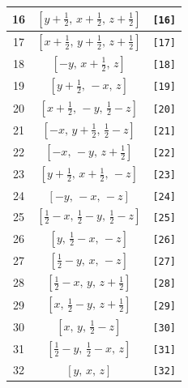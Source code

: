 \documentclass[fleqn,8pt]{jsarticle}
\begin{document}
\begin{longtable}{ccc}
16 & $\left[ y + \frac{1}{2},\, x + \frac{1}{2},\, z + \frac{1}{2} \right]$ & {\tt [16]} \\ \hline
17 & $\left[ x + \frac{1}{2},\, y + \frac{1}{2},\, z + \frac{1}{2} \right]$ & {\tt [17]} \\ \hline
18 & $\left[ - y,\, x + \frac{1}{2},\, z \right]$ & {\tt [18]} \\ \hline
19 & $\left[ y + \frac{1}{2},\, - x,\, z \right]$ & {\tt [19]} \\ \hline
20 & $\left[ x + \frac{1}{2},\, - y,\, \frac{1}{2} - z \right]$ & {\tt [20]} \\ \hline
21 & $\left[ - x,\, y + \frac{1}{2},\, \frac{1}{2} - z \right]$ & {\tt [21]} \\ \hline
22 & $\left[ - x,\, - y,\, z + \frac{1}{2} \right]$ & {\tt [22]} \\ \hline
23 & $\left[ y + \frac{1}{2},\, x + \frac{1}{2},\, - z \right]$ & {\tt [23]} \\ \hline
24 & $\left[ - y,\, - x,\, - z \right]$ & {\tt [24]} \\ \hline
25 & $\left[ \frac{1}{2} - x,\, \frac{1}{2} - y,\, \frac{1}{2} - z \right]$ & {\tt [25]} \\ \hline
26 & $\left[ y,\, \frac{1}{2} - x,\, - z \right]$ & {\tt [26]} \\ \hline
27 & $\left[ \frac{1}{2} - y,\, x,\, - z \right]$ & {\tt [27]} \\ \hline
28 & $\left[ \frac{1}{2} - x,\, y,\, z + \frac{1}{2} \right]$ & {\tt [28]} \\ \hline
29 & $\left[ x,\, \frac{1}{2} - y,\, z + \frac{1}{2} \right]$ & {\tt [29]} \\ \hline
30 & $\left[ x,\, y,\, \frac{1}{2} - z \right]$ & {\tt [30]} \\ \hline
31 & $\left[ \frac{1}{2} - y,\, \frac{1}{2} - x,\, z \right]$ & {\tt [31]} \\ \hline
32 & $\left[ y,\, x,\, z \right]$ & {\tt [32]} \\
\end{longtable}
\end{document}
